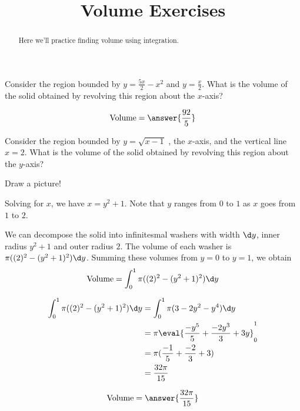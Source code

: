 \documentclass[handout]{ximera}
\title[Exercises:]{Volume Exercises}
\begin{document}
\begin{abstract}
  Here we'll practice finding volume using integration.
\end{abstract}
\maketitle

\begin{problem}
Consider the region bounded by $y = \frac{5x}{2}-x^2$ and
$y=\frac{x}{2}$.  What is the volume of the solid obtained by
revolving this region about the $x$-axis?


\begin{prompt}
  \[
	\textrm{Volume} = \answer{\frac{92}{5}}
	\]
\end{prompt}

\end{problem}

\begin{exercise}
Consider the region bounded by $y =\sqrt{x-1}$ , the $x$-axis, and the
vertical line $x=2$.  What is the volume of the solid obtained by
revolving this region about the $y$-axis?
\begin{hint}
  Draw a picture!
\end{hint}

\begin{hint}
  Solving for $x$, we have $x = y^2+1$.  Note that $y$ ranges from $0$ to $1$ as $x$ goes from $1$ to $2$.
\end{hint}

\begin{hint}
  We can decompose the solid into infinitesmal washers with width
  $\d y$, inner radius $y^2+1$ and outer radius $2$.  The volume of each
  washer is $\pi((2)^2 - (y^2+1)^2)\d y$.  Summing these volumes from
  $y=0$ to $y=1$, we obtain
  \[
  \textrm{Volume} = \int_0^1 \pi((2)^2 - (y^2+1)^2)\d y
  \]
\end{hint}

\begin{hint}
  \begin{align*}
    \int_0^1\pi((2)^2 - (y^2+1)^2)\d y &=  \int_0^1 \pi(3-2y^2-y^4)\d y\\
    &= \pi \eval{\frac{-y^5}{5}+\frac{-2y^3}{3}+3y}_0^1\\
    &=\pi(\frac{-1}{5}+\frac{-2}{3}+3)\\
    &=\frac{32\pi}{15}
  \end{align*}
\end{hint}

\begin{prompt}
  \[
  \textrm{Volume} = \answer{\frac{32\pi}{15}}
  \]
\end{prompt}
\end{exercise}
\end{document}
